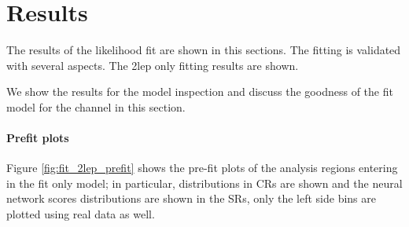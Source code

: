 \chapter{Results}

The results of the likelihood fit are shown in this sections. The fitting is validated with several aspects.
The 2lep only fitting results are shown.

We show the results for the model inspection and discuss the goodness of the fit model for the \tlep channel
in this section.

\subsubsection{Prefit plots}

Figure \ref{fig:fit_2lep_prefit} shows the pre-fit plots of the analysis regions entering in the \tlep fit only model;
in particular, \mjjtag distributions in \Zjets CRs are shown and the neural network scores distributions
are shown in the SRs, only the left side bins are plotted using real data as well.

